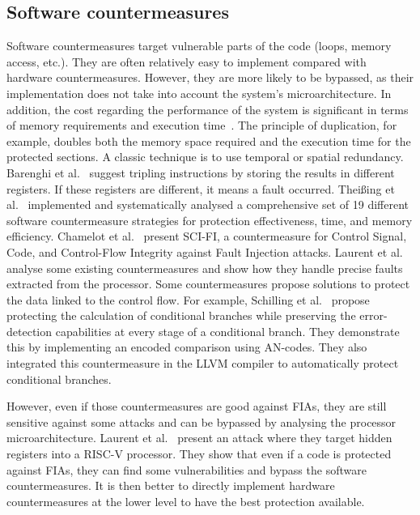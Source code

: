 \subsection{Software countermeasures}
Software countermeasures target vulnerable parts of the code (loops, memory access, etc.). They are often relatively easy to implement compared with hardware countermeasures. However, they are more likely to be bypassed, as their implementation does not take into account the system's microarchitecture.
In addition, the cost regarding the performance of the system is significant in terms of memory requirements and execution time~\cite{BCNTW-06-procieee}. The principle of duplication, for example, doubles both the memory space required and the execution time for the protected sections.
A classic technique is to use temporal or spatial redundancy. Barenghi et al.~\cite{BBKPR-10-wess} suggest tripling instructions by storing the results in different registers. If these registers are different, it means a fault occurred.
Theißing et al.~\cite{TMSSS-13-date} implemented and systematically analysed a comprehensive set of 19 different software countermeasure strategies for protection effectiveness, time, and memory efficiency.
Chamelot et al.~\cite{CCH-22-date} present SCI-FI, a countermeasure for Control Signal, Code, and Control-Flow Integrity against Fault Injection attacks.
Laurent et al.~\cite{LBDPP-19-microproc} analyse some existing countermeasures and show how they handle precise faults extracted from the processor.
Some countermeasures propose solutions to protect the data linked to the control flow. For example, Schilling et al.~\cite{SWM-18-date} propose protecting the calculation of conditional branches while preserving the error-detection capabilities at every stage of a conditional branch. They demonstrate this by implementing an encoded comparison using AN-codes. They also integrated this countermeasure in the LLVM compiler to automatically protect conditional branches.

However, even if those countermeasures are good against FIAs, they are still sensitive against some attacks and can be bypassed by analysing the processor microarchitecture. Laurent et al.~\cite{LBDP-19-date} present an attack where they target hidden registers into a \mbox{RISC-V} processor. They show that even if a code is protected against FIAs, they can find some vulnerabilities and bypass the software countermeasures. It is then better to directly implement hardware countermeasures at the lower level to have the best protection available.

